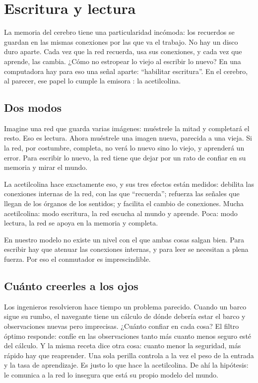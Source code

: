 \chapter{Escritura y lectura}

La memoria del cerebro tiene una particularidad incómoda: los recuerdos se guardan en las mismas conexiones por las que va el trabajo. No hay un disco duro aparte. Cada vez que la red recuerda, usa sus conexiones, y cada vez que aprende, las cambia. ¿Cómo no estropear lo viejo al escribir lo nuevo? En una computadora hay para eso una señal aparte: “habilitar escritura”. En el cerebro, al parecer, ese papel lo cumple la emisora : la acetilcolina.

\section*{Dos modos}

Imagine una red que guarda varias imágenes: muéstrele la mitad y completará el resto. Eso es lectura. Ahora muéstrele una imagen nueva, parecida a una vieja. Si la red, por costumbre, completa, no verá lo nuevo sino lo viejo, y aprenderá un error. Para escribir lo nuevo, la red tiene que dejar por un rato de confiar en su memoria y mirar el mundo.


La acetilcolina hace exactamente eso, y sus tres efectos están medidos: debilita las conexiones internas de la red, con las que “recuerda”; refuerza las señales que llegan de los órganos de los sentidos; y facilita el cambio de conexiones. Mucha acetilcolina: modo escritura, la red escucha al mundo y aprende. Poca: modo lectura, la red se apoya en la memoria y completa.

En nuestro modelo no existe un nivel con el que ambas cosas salgan bien. Para escribir hay que atenuar las conexiones internas, y para leer se necesitan a plena fuerza. Por eso el conmutador es imprescindible.

\section*{Cuánto creerles a los ojos}

Los ingenieros resolvieron hace tiempo un problema parecido. Cuando un barco sigue su rumbo, el navegante tiene un cálculo de dónde debería estar el barco y observaciones nuevas pero imprecisas. ¿Cuánto confiar en cada cosa? El filtro óptimo responde: confíe en las observaciones tanto más cuanto menos seguro esté del cálculo. Y la misma receta dice otra cosa: cuanto menor la seguridad, más rápido hay que reaprender. Una sola perilla controla a la vez el peso de la entrada y la tasa de aprendizaje. Es justo lo que hace la acetilcolina. De ahí la hipótesis: le comunica a la red lo insegura que está su propio modelo del mundo.

